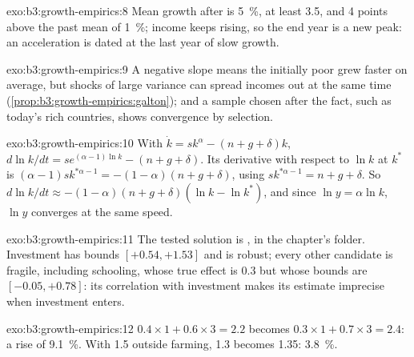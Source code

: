 \begin{solution}{exo:b3:growth-empirics:8}
Mean growth after is 5~\%, at least 3.5, and 4 points above the past mean of 1~\%; income keeps
rising, so the end year is a new peak: an acceleration is dated at the last year
of slow growth.
\end{solution}

\begin{solution}{exo:b3:growth-empirics:9}
A negative slope means the initially poor grew faster on average, but shocks of
large variance can spread incomes out at the same time
(\cref{prop:b3:growth-empirics:galton}); and a sample chosen after the fact, such as
today's rich countries, shows convergence by selection.
\end{solution}

\begin{solution}{exo:b3:growth-empirics:10}
With $\dot k = s k^{\alpha} - (n + g + \delta)k$, $d\ln k/dt = s e^{(\alpha - 1)\ln k} - (n + g + \delta)$. Its derivative with respect to $\ln k$ at $k^*$ is
$(\alpha - 1)s k^{*\alpha - 1} = -(1 - \alpha)(n + g + \delta)$, using $s k^{*\alpha - 1} = n + g + \delta$. So $d\ln k/dt \approx -(1 - \alpha)(n + g + \delta)(\ln k - \ln k^*)$, and since $\ln y = \alpha\ln k$, $\ln y$
converges at the same speed.
\end{solution}

\begin{solution}{exo:b3:growth-empirics:11}
The tested solution is , in the chapter's 
folder. Investment has bounds $[+0.54, +1.53]$ and is robust; every other candidate is fragile,
including schooling, whose true effect is 0.3 but whose bounds are $[-0.05, +0.78]$: its correlation
with investment makes its estimate imprecise when investment enters.
\end{solution}

\begin{solution}{exo:b3:growth-empirics:12}
$0.4 \times 1 + 0.6 \times 3 = 2.2$ becomes $0.3 \times 1 + 0.7 \times 3 = 2.4$: a rise of 9.1~\%. With 1.5 outside farming, 1.3 becomes 1.35: 3.8~\%.
\end{solution}

